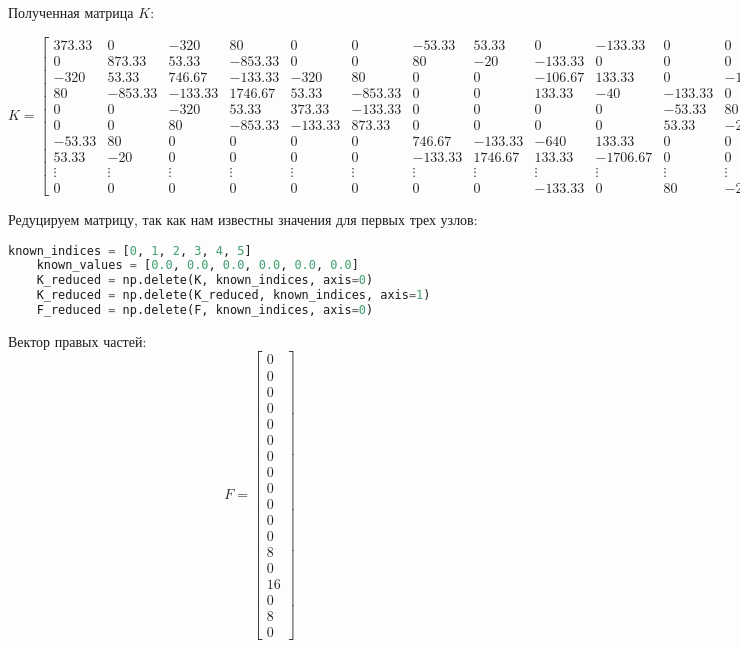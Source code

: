 \documentclass[a4paper, 12pt]{article}
\begin{document}
Полученная матрица \(K\):
\newpage
\begin{landscape}
\[
K = 
\begin{bmatrix}
373.33 & 0 & -320 & 80 & 0 & 0 & -53.33 & 53.33 & 0 & -133.33 & 0 & 0 & 0 & 0 & 0 & 0 & 0 & 0 \\
0 & 873.33 & 53.33 & -853.33 & 0 & 0 & 80 & -20 & -133.33 & 0 & 0 & 0 & 0 & 0 & 0 & 0 & 0 & 0 \\
-320 & 53.33 & 746.67 & -133.33 & -320 & 80 & 0 & 0 & -106.67 & 133.33 & 0 & -133.33 & 0 & 0 & 0 & 0 & 0 & 0 \\
80 & -853.33 & -133.33 & 1746.67 & 53.33 & -853.33 & 0 & 0 & 133.33 & -40 & -133.33 & 0 & 0 & 0 & 0 & 0 & 0 & 0 \\
0 & 0 & -320 & 53.33 & 373.33 & -133.33 & 0 & 0 & 0 & 0 & -53.33 & 80 & 0 & 0 & 0 & 0 & 0 & 0 \\
0 & 0 & 80 & -853.33 & -133.33 & 873.33 & 0 & 0 & 0 & 0 & 53.33 & -20 & 0 & 0 & 0 & 0 & 0 & 0 \\
-53.33 & 80 & 0 & 0 & 0 & 0 & 746.67 & -133.33 & -640 & 133.33 & 0 & 0 & -53.33 & 53.33 & 0 & -133.33 & 0 & 0 \\
53.33 & -20 & 0 & 0 & 0 & 0 & -133.33 & 1746.67 & 133.33 & -1706.67 & 0 & 0 & 80 & -20 & -133.33 & 0 & 0 & 0 \\
\vdots & \vdots & \vdots & \vdots & \vdots & \vdots & \vdots & \vdots & \vdots & \vdots & \vdots & \vdots & \vdots & \vdots & \vdots & \vdots & \vdots & \vdots \\
0 & 0 & 0 & 0 & 0 & 0 & 0 & 0 & -133.33 & 0 & 80 & -20 & 0 & 0 & 53.33 & -853.33 & 0 & 873.33
\end{bmatrix}
\]
\end{landscape}

\newpage
Редуцируем матрицу, так как нам известны значения для первых трех узлов:
\begin{lstlisting}[language=Python]
	known_indices = [0, 1, 2, 3, 4, 5]   
	known_values = [0.0, 0.0, 0.0, 0.0, 0.0, 0.0]  
	K_reduced = np.delete(K, known_indices, axis=0)  
	K_reduced = np.delete(K_reduced, known_indices, axis=1)  
	F_reduced = np.delete(F, known_indices, axis=0)
\end{lstlisting}

Вектор правых частей:
\[
F = 
\begin{bmatrix}
0 \\ 0 \\ 0 \\ 0 \\ 0 \\ 0 \\ 0 \\ 0 \\ 0 \\
0 \\ 0 \\ 0 \\ 8 \\ 0 \\ 16 \\ 0 \\ 8 \\ 0
\end{bmatrix}
\]
\end{document}
